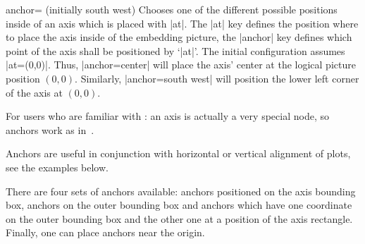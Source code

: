 \begin{pgfplotskey}{anchor= (initially south west)}
\label{option:anchor}%
Chooses one of the different possible positions inside of an axis which is placed with |at|. The |at| key defines the position where to place the axis inside of the embedding picture, the |anchor| key defines which point of the axis shall be positioned by `|at|'. The initial configuration assumes |at={(0,0)}|. Thus, |anchor=center| will place the axis' center at the logical picture position $(0,0)$. Similarly, |anchor=south west| will position the lower left corner of the axis at $(0,0)$.

For users who are familiar with \Tikz: an axis is actually a very special node, so anchors work as in~\cite{tikz}.

Anchors are useful in conjunction with horizontal or vertical alignment of plots, see the examples below.

There are four sets of anchors available: anchors positioned on the axis bounding box, anchors on the outer bounding box and anchors which have one coordinate on the outer bounding box and the other one at a position of the axis rectangle. Finally, one can place anchors near the origin.


\end{pgfplotskey}

